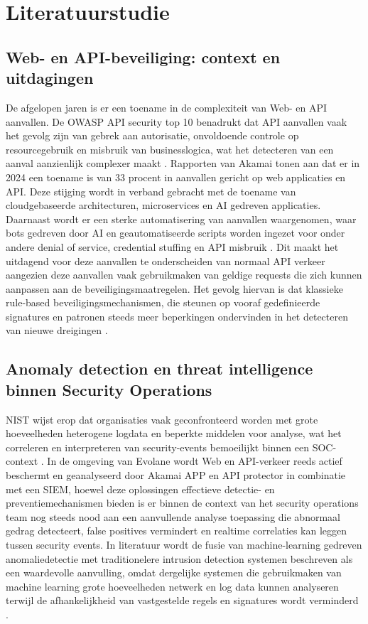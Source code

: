 
\section{Literatuurstudie}%
\label{sec:literatuurstudie}

\subsection{Web- en API-beveiliging: context en uitdagingen}

De afgelopen jaren is er een toename in de complexiteit van Web- en API aanvallen. De OWASP API security top 10 benadrukt dat API aanvallen vaak het gevolg zijn van gebrek aan autorisatie, onvoldoende controle op resourcegebruik en misbruik van businesslogica, wat het detecteren van een aanval aanzienlijk complexer maakt \textcite{OWASP2023}. Rapporten van Akamai tonen aan dat er in 2024 een toename is van 33 procent in aanvallen gericht op web applicaties en API. Deze stijging wordt in verband gebracht met de toename van cloudgebaseerde architecturen, microservices en AI gedreven applicaties.
Daarnaast wordt er een sterke automatisering van aanvallen waargenomen, waar bots gedreven door AI en geautomatiseerde scripts worden ingezet voor onder andere denial of service, credential stuffing en API misbruik \autocite{Akamai2025}. Dit maakt het uitdagend voor deze aanvallen te onderscheiden van normaal API verkeer aangezien deze aanvallen vaak gebruikmaken van geldige requests die zich kunnen aanpassen aan de beveiligingsmaatregelen. Het gevolg hiervan is dat klassieke rule-based beveiligingsmechanismen, die steunen op vooraf gedefinieerde signatures en patronen steeds meer beperkingen ondervinden in het detecteren van nieuwe dreigingen \autocite{Standards2007}.


\subsection{Anomaly detection en threat intelligence binnen Security Operations}

NIST wijst erop dat organisaties vaak geconfronteerd worden met grote hoeveelheden heterogene logdata en beperkte middelen voor analyse, wat het correleren en interpreteren van security-events bemoeilijkt binnen een SOC-context \Autocite{Kent2006}. In de omgeving van Evolane wordt Web en API-verkeer reeds actief beschermt en geanalyseerd door Akamai APP en API protector in combinatie met een SIEM, hoewel deze oplossingen effectieve detectie- en preventiemechanismen bieden is er binnen de context van het security operations team nog steeds nood aan een aanvullende analyse toepassing die abnormaal gedrag detecteert, false positives vermindert en realtime correlaties kan leggen tussen security events. In literatuur wordt de fusie van machine-learning gedreven anomaliedetectie met traditionelere intrusion detection systemen beschreven als een waardevolle aanvulling, omdat dergelijke systemen die gebruikmaken van machine learning grote hoeveelheden netwerk en log data kunnen analyseren terwijl de afhankelijkheid van vastgestelde regels en signatures wordt verminderd \Autocite{Kumar_2025}.

